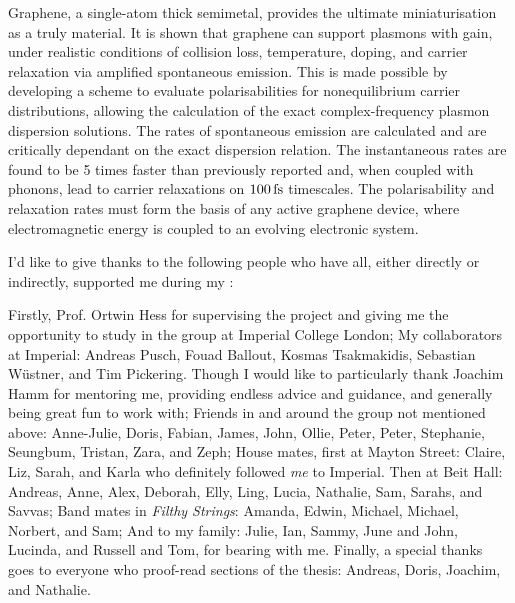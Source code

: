 Graphene, a single-atom thick semimetal, provides the ultimate miniaturisation
as a truly \twod material.
It is shown that graphene can support plasmons with gain, under realistic
conditions of collision loss, temperature, doping, and carrier relaxation via
amplified spontaneous emission.
This is made possible by developing a scheme to evaluate polarisabilities
for nonequilibrium carrier distributions, allowing the calculation of the exact
\rpa complex-frequency plasmon dispersion solutions.
The rates of spontaneous emission are calculated and are critically dependant on
the exact dispersion relation.
The instantaneous rates are found to be 5 times faster than previously reported
and, when coupled with phonons, lead to carrier relaxations on $100\operatorname{fs}$
timescales.
The polarisability and relaxation rates must form the basis of any active
graphene device, where electromagnetic energy is coupled to an evolving
electronic system.


\normalsize


\clearpage

I'd like to give thanks to the following people who have all, either directly or
indirectly, supported me during my \phd:

Firstly, Prof. Ortwin Hess for supervising the project and giving me the
opportunity to study in the group at Imperial College London;
My collaborators at Imperial:
Andreas Pusch, Fouad Ballout, Kosmas Tsakmakidis, Sebastian Wüstner, and
Tim Pickering.
Though I would like to particularly thank Joachim Hamm for mentoring me,
providing endless advice and guidance, and generally being great fun to work
with;
Friends in and around the group not mentioned above:
Anne-Julie, Doris, Fabian, James, John, Ollie, Peter, Peter, Stephanie,
Seungbum, Tristan, Zara, and Zeph;
House mates, first at Mayton Street:
Claire, Liz, Sarah, and Karla who definitely followed \emph{me} to Imperial.
Then at Beit Hall:
Andreas, Anne, Alex, Deborah, Elly, Ling, Lucia, Nathalie, Sam, Sarahs, and
Savvas;
Band mates in \emph{Filthy Strings}: Amanda, Edwin, Michael, Michael,
Norbert, and Sam;
And to my family: Julie, Ian, Sammy, June and John, Lucinda, and Russell and
Tom, for bearing with me.
Finally, a special thanks goes to everyone who proof-read sections of the
thesis:
Andreas, Doris, Joachim, and Nathalie.



